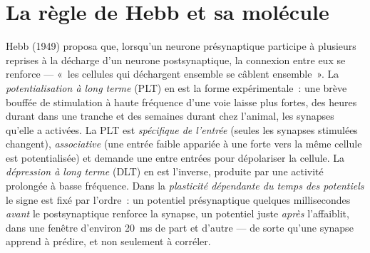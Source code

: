 \section{La règle de Hebb et sa molécule}

\begin{definition}\label{def:b3:learning-memory:ltp}
Hebb (1949) proposa que, lorsqu'un neurone présynaptique participe à
plusieurs reprises à la décharge d'un neurone postsynaptique, la
connexion entre eux se renforce --- «~les cellules qui déchargent
ensemble se câblent ensemble~». La \emph{potentialisation à long terme}
(PLT) en est la forme expérimentale~: une brève bouffée de stimulation à
haute fréquence d'une voie laisse plus fortes, des heures durant dans
une tranche et des semaines durant chez l'animal, les synapses qu'elle a
activées. La PLT est \emph{spécifique de l'entrée} (seules les synapses
stimulées changent), \emph{associative} (une entrée faible appariée à
une forte vers la même cellule est potentialisée) et demande une
\emph{} entre entrées pour dépolariser la cellule. La
\emph{dépression à long terme} (DLT) en est l'inverse, produite par une
activité prolongée à basse fréquence. Dans la \emph{plasticité
dépendante du temps des potentiels} le signe est fixé par l'ordre~: un
potentiel présynaptique quelques millisecondes \emph{avant} le
postsynaptique renforce la synapse, un potentiel juste \emph{après}
l'affaiblit, dans une fenêtre d'environ \qty{20}{ms} de part et d'autre
--- de sorte qu'une synapse apprend à prédire, et non seulement à
corréler.
\end{definition}

